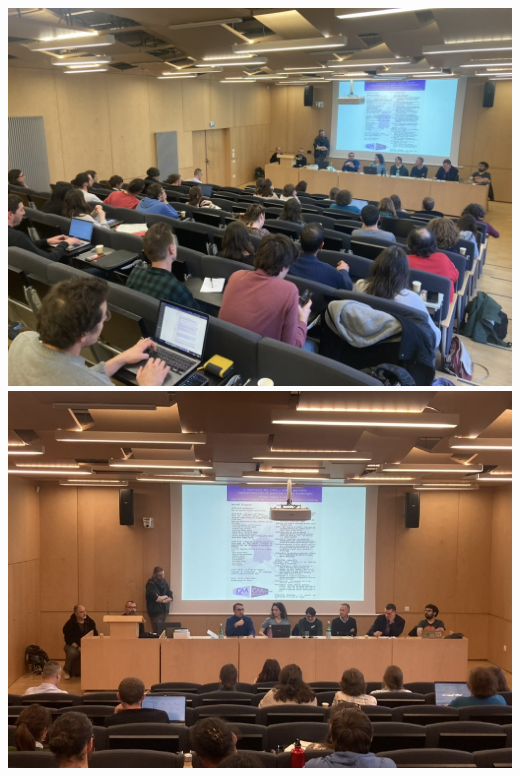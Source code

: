 \documentclass[xcolor=dvipsnames, 10pt, french, american]{beamer}
\begin{document}
\begin{frame}
    \begin{center}
        \includegraphics[height=0.45\textheight]{figures/acqua1}
        \includegraphics[height=0.45\textheight]{figures/acqua2}
    \end{center}
\end{frame}
\end{document}
